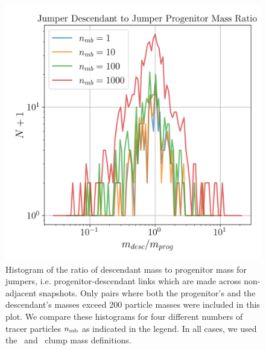 \begin{figure}
  \centering
  \includegraphics[width=.9\linewidth, keepaspectratio]{images/tree-statistics-my-threshold/jumper_mass_ratio-ntrace.png}%
  \caption{ Histogram of the ratio of descendant mass to progenitor
    mass for jumpers, i.e.  progenitor-descendant links which are made
    across non-adjacent snapshots.  Only pairs where both the
    progenitor's and the descendant's masses exceed 200 particle
    masses were included in this plot.  We compare these histograms
    for four different numbers of tracer particles $n_{\rm mb}$ as
    indicated in the legend.  In all cases, we used the \exc\ and
    \sad\ clump mass definitions.
  }%
  \label{fig:jumper-mass-ratio}
\end{figure}


